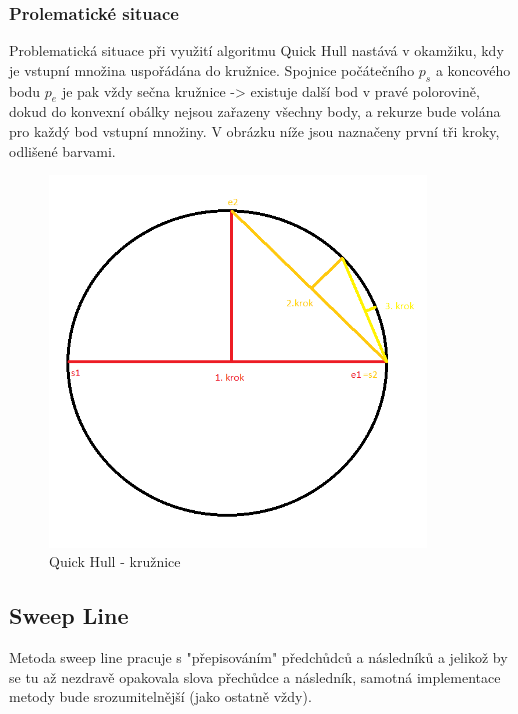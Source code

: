 \documentclass[a4paper, 12pt]{article}
\begin{document}
\subsubsection{Prolematické situace}
Problematická situace při využití algoritmu Quick Hull nastává v okamžiku, kdy je vstupní množina uspořádána do kružnice. Spojnice počátečního $p_s$ a koncového bodu $p_e$ je pak vždy sečna kružnice -> existuje další bod v pravé polorovině, dokud do konvexní obálky nejsou zařazeny všechny body, a rekurze bude volána pro každý bod vstupní množiny. V obrázku níže jsou naznačeny první tři kroky, odlišené barvami.

\begin{figure}[h]
	\centering
	\includegraphics[width=10cm]{QH_kruznice.png}
	\caption{Quick Hull - kružnice}
\end{figure}
\clearpage

\clearpage
\subsection{Sweep Line}
Metoda sweep line pracuje s "přepisováním" předchůdců a  následníků a jelikož by se tu až nezdravě opakovala slova přechůdce a následník, samotná implementace metody bude srozumitelnější (jako ostatně vždy).
\end{document}
